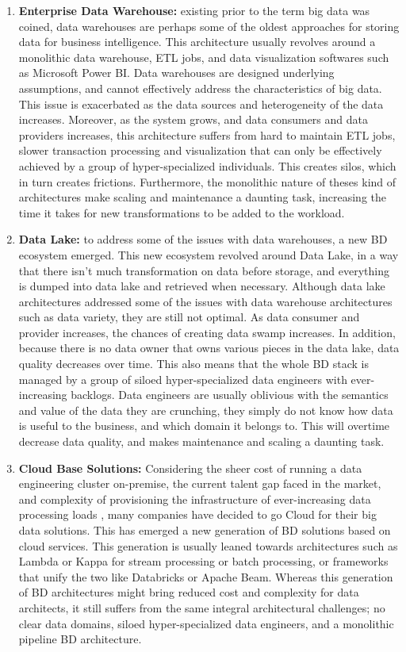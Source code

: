 \documentclass[runningheads]{llncs}
\begin{document}
\begin{enumerate}
    \item \textbf{Enterprise Data Warehouse:} existing prior to the term big data was coined, data warehouses are perhaps some of the oldest approaches for storing data for business intelligence. This architecture usually revolves around a monolithic data warehouse, ETL jobs, and data visualization softwares such as Microsoft Power BI. Data warehouses are designed underlying assumptions, and cannot effectively address the characteristics of big data. This issue is exacerbated as the data sources and heterogeneity of the data increases. Moreover, as the system grows, and data consumers and data providers increases, this architecture suffers from hard to maintain ETL jobs, slower transaction processing and visualization that can only be effectively achieved by a group of hyper-specialized individuals. This creates silos, which in turn creates frictions. Furthermore, the monolithic nature of theses kind of architectures make scaling and maintenance a daunting task, increasing the time it takes for new transformations to be added to the workload.
    \item \textbf{Data Lake:} to address some of the issues with data warehouses, a new BD ecosystem emerged. This new ecosystem revolved around Data Lake, in a way that there isn't much transformation on data before storage, and everything is dumped into data lake and retrieved when necessary. Although data lake architectures addressed some of the issues with data warehouse architectures such as data variety, they are still not optimal. As data consumer and provider increases, the chances of creating data swamp increases. In addition, because there is no data owner that owns various pieces in the data lake, data quality decreases over time. This also means that the whole BD stack is managed by a group of siloed hyper-specialized data engineers with ever-increasing backlogs. Data engineers are usually oblivious with the semantics and value of the data they are crunching, they simply do not know how data is useful to the business, and which domain it belongs to. This will overtime decrease data quality, and makes maintenance and scaling a daunting task. 
    \item \textbf{Cloud Base Solutions:} Considering the sheer cost of running a data engineering cluster on-premise, the current talent gap faced in the market, and complexity of provisioning the infrastructure of ever-increasing data processing loads \cite{AtaeiHype}, many companies have decided to go Cloud for their big data solutions. This has emerged a new generation of BD solutions based on cloud services. This generation is usually leaned towards architectures such as Lambda or Kappa for stream processing or batch processing, or frameworks that unify the two like Databricks or Apache Beam. Whereas this generation of BD architectures might bring reduced cost and complexity for data architects, it still suffers from the same integral architectural challenges; no clear data domains, siloed hyper-specialized data engineers, and a monolithic pipeline BD architecture.
\end{enumerate}
\end{document}
